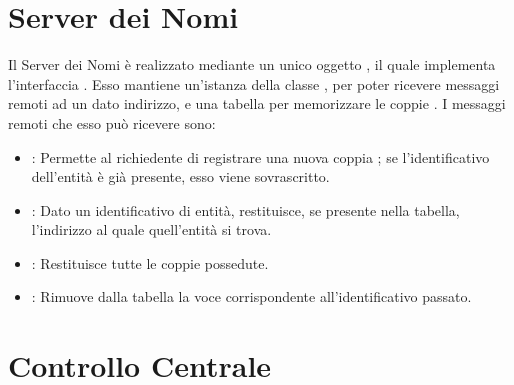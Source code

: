	\section{Server dei Nomi}
	
	Il Server dei Nomi è realizzato mediante un unico oggetto  , il quale implementa l'interfaccia . Esso mantiene un'istanza della classe , per poter ricevere messaggi remoti ad un dato indirizzo, e una tabella per memorizzare le coppie . I messaggi remoti che esso può ricevere sono:
	\begin{itemize}
		\item {}: Permette al richiedente di registrare una nuova coppia ; se l'identificativo dell'entità è già presente, esso viene sovrascritto.
		\item {}: Dato un identificativo di entità, restituisce, se presente nella tabella, l'indirizzo al quale quell'entità si trova.
		\item {}: Restituisce tutte le coppie  possedute.
		\item {}: Rimuove dalla tabella la voce corrispondente all'identificativo passato.
	\end{itemize}
	
	\section{Controllo Centrale}
	
